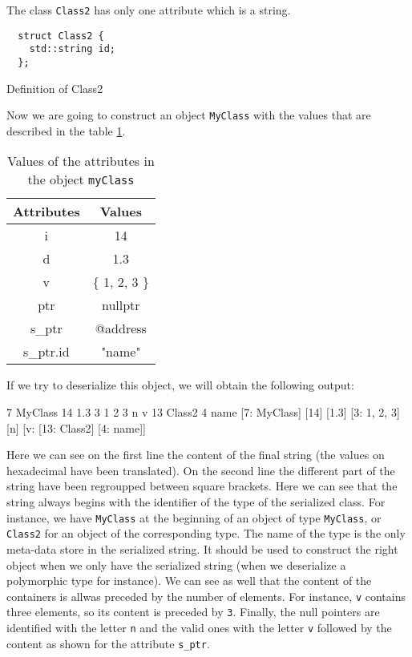 The class \texttt{Class2} has only one attribute which is a string.

\begin{listing}[ht!]
\begin{verbatim}
  struct Class2 {
    std::string id;
  };
\end{verbatim}
\caption{Definition of Class2}
\label{lst:serexmysecondclass}
\end{listing}

Now we are going to construct an object \texttt{MyClass} with the values that
are described in the table \ref{tbl:serexvals}.

\begin{table}[h!]
\centering
\begin{tabular}{|c|c|}
 \hline
 Attributes & Values \\
 \hline\hline
  i & 14 \\
 \hline
  d & 1.3 \\
 \hline
  v & \{ 1, 2, 3 \} \\
 \hline
  ptr & nullptr \\
 \hline
  s\_ptr & @address \\
 \hline\hline
  s\_ptr.id & "name" \\
 \hline
\end{tabular}
\caption{Values of the attributes in the object \texttt{myClass}}
\label{tbl:serexvals}
\end{table}

If we try to deserialize this object, we will obtain the following output:

\begin{format}
  7 MyClass 14 1.3 3 1 2 3 n v 13 Class2 4 name
  [7: MyClass] [14] [1.3] [3: 1, 2, 3] [n] [v: [13: Class2] [4: name]]
\end{format}\leavevmode\newline

Here we can see on the first line the content of the final string (the values on
hexadecimal have been translated). On the second line the different part of the
string have been regroupped between square brackets. Here we can see that the
string always begins with the identifier of the type of the serialized class.
For instance, we have \texttt{MyClass} at the beginning of an object of type
\texttt{MyClass}, or \texttt{Class2} for an object of the corresponding type.
The name of the type is the only meta-data store in the serialized string. It
should be used to construct the right object when we only have the serialized
string (when we deserialize a polymorphic type for instance). We can see as well
that the content of the containers is allwas preceded by the number of elements.
For instance, \texttt{v} contains three elements, so its content is preceded by
\texttt{3}. Finally, the null pointers are identified with the letter \texttt{n}
and the valid ones with the letter \texttt{v} followed by the content as shown
for the attribute \texttt{s\_ptr}.

